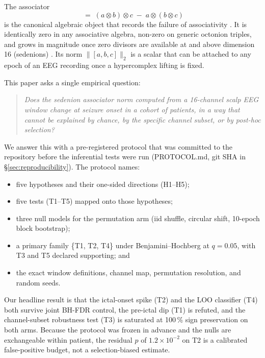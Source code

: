 \documentclass[11pt,twocolumn]{article}
\begin{document}
The associator
\begin{equation}
  [a,b,c] \;=\; (a\otimes b)\otimes c \;-\; a\otimes(b\otimes c)
  \label{eq:associator}
\end{equation}
is the canonical algebraic object that records the failure of
associativity \cite{baez2002octonions,schafer1966}. It is identically
zero in any associative algebra, non-zero on generic octonion triples,
and grows in magnitude once zero divisors are available at and above
dimension 16 (sedenions) \cite{moreno1998zero,kinyon2004zero}. Its norm
$\|[a,b,c]\|_2$ is a scalar that can be attached to any epoch of an
EEG recording once a hypercomplex lifting is fixed.

This paper asks a single empirical question:
\begin{quote}
\emph{Does the sedenion associator norm computed from a 16-channel
scalp EEG window change at seizure onset in a cohort of patients, in a
way that cannot be explained by chance, by the specific channel
subset, or by post-hoc selection?}
\end{quote}

We answer this with a pre-registered protocol that was committed to
the repository before the inferential tests were run
(PROTOCOL.md, git SHA in \S\ref{sec:reproducibility}). The protocol
names:
\begin{itemize}
\item five hypotheses and their one-sided directions (H1--H5);
\item five tests (T1--T5) mapped onto those hypotheses;
\item three null models for the permutation arm (iid shuffle,
      circular shift, 10-epoch block bootstrap);
\item a primary family \{T1, T2, T4\} under
      Benjamini--Hochberg at $q=0.05$, with T3 and T5 declared
      supporting; and
\item the exact window definitions, channel map, permutation
      resolution, and random seeds.
\end{itemize}

Our headline result is that the ictal-onset spike (T2) and the
LOO classifier (T4) both survive joint BH-FDR control, the pre-ictal
dip (T1) is refuted, and the channel-subset robustness test (T3) is
saturated at 100\,\% sign preservation on both arms. Because the
protocol was frozen in advance and the nulls are exchangeable within
patient, the residual $p$ of $1.2\times10^{-2}$ on T2 is a calibrated
false-positive budget, not a selection-biased estimate.
\end{document}
